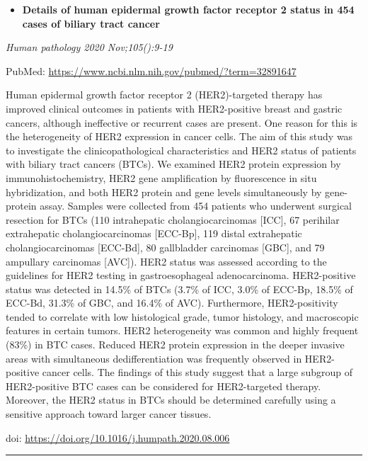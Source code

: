 \documentclass[
]{article}
\providecommand{\tightlist}{%
  \setlength{\itemsep}{0pt}\setlength{\parskip}{0pt}}
\begin{document}
\begin{itemize}
\tightlist
\item
  \textbf{Details of human epidermal growth factor receptor 2 status in
  454 cases of biliary tract cancer}
\end{itemize}

\emph{Human pathology 2020 Nov;105():9-19}

PubMed: \url{https://www.ncbi.nlm.nih.gov/pubmed/?term=32891647}

Human epidermal growth factor receptor 2 (HER2)-targeted therapy has
improved clinical outcomes in patients with HER2-positive breast and
gastric cancers, although ineffective or recurrent cases are present.
One reason for this is the heterogeneity of HER2 expression in cancer
cells. The aim of this study was to investigate the clinicopathological
characteristics and HER2 status of patients with biliary tract cancers
(BTCs). We examined HER2 protein expression by immunohistochemistry,
HER2 gene amplification by fluorescence in situ hybridization, and both
HER2 protein and gene levels simultaneously by gene-protein assay.
Samples were collected from 454 patients who underwent surgical
resection for BTCs (110 intrahepatic cholangiocarcinomas {[}ICC{]}, 67
perihilar extrahepatic cholangiocarcinomas {[}ECC-Bp{]}, 119 distal
extrahepatic cholangiocarcinomas {[}ECC-Bd{]}, 80 gallbladder carcinomas
{[}GBC{]}, and 79 ampullary carcinomas {[}AVC{]}). HER2 status was
assessed according to the guidelines for HER2 testing in
gastroesophageal adenocarcinoma. HER2-positive status was detected in
14.5\% of BTCs (3.7\% of ICC, 3.0\% of ECC-Bp, 18.5\% of ECC-Bd, 31.3\%
of GBC, and 16.4\% of AVC). Furthermore, HER2-positivity tended to
correlate with low histological grade, tumor histology, and macroscopic
features in certain tumors. HER2 heterogeneity was common and highly
frequent (83\%) in BTC cases. Reduced HER2 protein expression in the
deeper invasive areas with simultaneous dedifferentiation was frequently
observed in HER2-positive cancer cells. The findings of this study
suggest that a large subgroup of HER2-positive BTC cases can be
considered for HER2-targeted therapy. Moreover, the HER2 status in BTCs
should be determined carefully using a sensitive approach toward larger
cancer tissues.

doi: \url{https://doi.org/10.1016/j.humpath.2020.08.006}

\begin{center}\rule{0.5\linewidth}{0.5pt}\end{center}
\end{document}
